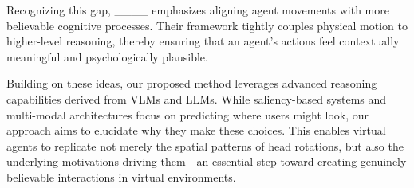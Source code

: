 Recognizing this gap, ____ emphasizes aligning agent movements with more believable cognitive processes. Their framework tightly couples physical motion to higher-level reasoning, thereby ensuring that an agent’s actions feel contextually meaningful and psychologically plausible. 

Building on these ideas, our proposed method leverages advanced reasoning capabilities derived from VLMs and LLMs. While saliency-based systems and multi-modal architectures focus on predicting where users might look, our approach aims to elucidate why they make these choices. This enables virtual agents to replicate not merely the spatial patterns of head rotations, but also the underlying motivations driving them—an essential step toward creating genuinely believable interactions in virtual environments.